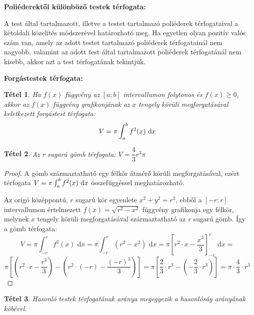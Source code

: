 \documentclass[12pt,a4paper]{article}
\newtheorem{theorem}{Tétel} [section]
\begin{document}
\textbf{Poliéderektől különböző testek térfogata:}

A test által tartalmazott, illetve a testet tartalmazó poliéderek térfogataival a kétoldali közelítés módszerével határozható meg. Ha egyetlen olyan pozitív valós szám van, amely az adott testet tartalmazó poliéderek térfogatainál nem nagyobb, valamint az adott test által tartalmazott poliéderek térfogatánál nem kisebb, akkor azt a test térfogatának tekintjük.

\textbf{Forgástestek térfogata:}
\begin{theorem}
Ha $f(x)$ függvény az $[a; b]$ intervallumon folytonos és $f(x) \geq 0$, akkor az $f(x)$ függvény grafikonjának az $x$ tengely körüli megforgatásával keletkezett forgástest térfogata:
$$V=\pi\int_a^bf^2(x){\normalfont\text{ d}}x$$
\end{theorem}
\begin{theorem}
 Az r sugarú gömb térfogata: $V=\dfrac{4}{3}r^3\pi$
\end{theorem}
\begin{proof}
A gömb származtatható egy félkör átmérő körüli megforgatásával, ezért térfogata $V=\pi\int_a^bf^2(x){\normalfont\text{ d}}x$  összefüggéssel meghatározható.

Az origó középpontú, $r$ sugarú kör egyenlete $x^2 + y^2 = r^2$, ebből a $[-r; r]$ intervallumon értelmezett $f(x)=\sqrt{r^2-x^2}$ függvény grafikonja egy félkör, melynek $x$ tengely körüli megforgatásával származtatható az $r$ sugarú gömb. Így a gömb térfogata:
$$V=\pi\int_{-r}^rf^2(x)\text{ d}x=\pi\int_{-r}^r(r^2-x^2)\text{ d}x=\pi\left[r^2\cdot x-\dfrac{x^3}{3} \right]^r_{-r}\text{ d}x=$$
$$\pi\left[\left(r^2\cdot r-\dfrac{r^3}{3} \right)- \left(r^2\cdot (-r)-\dfrac{(-r)^3}{3} \right)\right]=\pi\left[\dfrac{2}{3}\cdot r^3-\left(-\dfrac{2}{3}\cdot r^3 \right) \right]=\pi\cdot \dfrac{4}{3}\cdot r^3$$
\end{proof}

\begin{theorem}
Hasonló testek térfogatának aránya megegyezik a hasonlóság arányának köbével.
\end{theorem}
\end{document}
